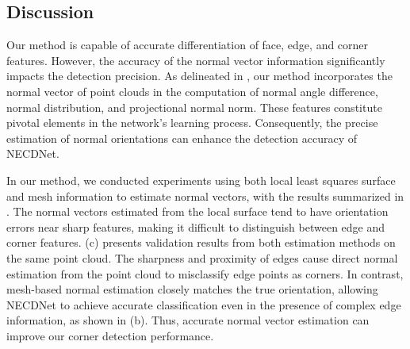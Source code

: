 \documentclass[lettersize,journal]{IEEEtran}
\begin{document}

\subsection{Discussion}
Our method is capable of accurate differentiation of face, edge, and corner features. However, the accuracy of the normal vector information significantly impacts the detection precision.
As delineated in , our method incorporates the normal vector of point clouds in the computation of normal angle difference, normal distribution, and projectional normal norm. These features constitute pivotal elements in the network's learning process. Consequently, the precise estimation of normal orientations can enhance the detection accuracy of NECDNet.

In our method, we conducted experiments using both local least squares surface and mesh information to estimate normal vectors, with the results summarized in . The normal vectors estimated from the local surface tend to have orientation errors near sharp features, making it difficult to distinguish between edge and corner features. (c) presents validation results from both estimation methods on the same point cloud. The sharpness and proximity of edges cause direct normal estimation from the point cloud to misclassify edge points as corners. 
In contrast, mesh-based normal estimation closely matches the true orientation, allowing NECDNet to achieve accurate classification even in the presence of complex edge information, as shown in (b). Thus, accurate normal vector estimation can improve our corner detection performance.
\end{document}
